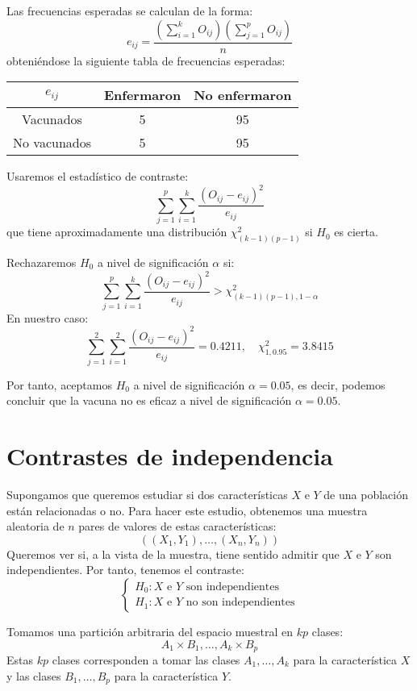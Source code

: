 \begin{exercise}
    Las frecuencias esperadas se calculan de la forma:
    $$e_{ij} = \frac{(\sum_{i=1}^k O_{ij})(\sum_{j=1}^p O_{ij})}{n}$$
    obteniéndose la siguiente tabla de frecuencias esperadas:
    \begin{center}
        \begin{tabular}{| c | c c |}
            \hline
            $e_{ij}$     & Enfermaron & No enfermaron \\
            \hline
            Vacunados    & 5          & 95            \\
            No vacunados & 5          & 95            \\
            \hline
        \end{tabular}
    \end{center}

    Usaremos el estadístico de contraste:
    $$\sum_{j=1}^p \sum_{i=1}^k \frac{(O_{ij}-e_{ij})^2}{e_{ij}}$$
    que tiene aproximadamente una distribución $\chi^2_{(k-1)(p-1)}$ si $H_0$ es cierta.

    Rechazaremos $H_0$ a nivel de significación $\alpha$ si:
    $$\sum_{j=1}^p \sum_{i=1}^k \frac{(O_{ij}-e_{ij})^2}{e_{ij}} > \chi^2_{(k-1)(p-1), 1-\alpha}$$
    En nuestro caso:
    $$\sum_{j=1}^2 \sum_{i=1}^2 \frac{(O_{ij}-e_{ij})^2}{e_{ij}} = 0.4211, \quad \chi^2_{1, 0.95} = 3.8415$$

    Por tanto, aceptamos $H_0$ a nivel de significación $\alpha = 0.05$, es decir, podemos concluir que la vacuna no es eficaz a nivel de significación $\alpha = 0.05$.
\end{exercise}

\section{Contrastes de independencia}
Supongamos que queremos estudiar si dos características $X$ e $Y$ de una población están relacionadas o no.
Para hacer este estudio, obtenemos una muestra aleatoria de $n$ pares de valores de estas características:
$$((X_1, Y_1), \dots, (X_n, Y_n))$$
Queremos ver si, a la vista de la muestra, tiene sentido admitir que $X$ e $Y$ son independientes.
Por tanto, tenemos el contraste:
$$\begin{cases}
        H_0: X \text{ e } Y \text{ son independientes} \\
        H_1: X \text{ e } Y \text{ no son independientes}
    \end{cases}$$

Tomamos una partición arbitraria del espacio muestral en $kp$ clases:
$$A_1 \times B_1, \dots, A_k \times B_p$$
Estas $kp$ clases corresponden a tomar las clases $A_1, \dots, A_k$ para la característica $X$ y las clases $B_1, \dots, B_p$ para la característica $Y$.


